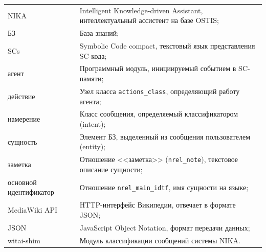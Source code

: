 \label{sec:reduction}

\noindent
\begin{tabular}{@{}p{3.6cm}@{\ \mdash\ }p{11.0cm}@{}}
NIKA & Intelligent Knowledge-driven Assistant, интеллектуальный ассистент на базе OSTIS;\\
БЗ & База знаний;\\
SCs & Symbolic Code compact, текстовый язык представления SC-кода;\\
агент & Программный модуль, инициируемый событием в SC-памяти;\\
действие & Узел класса \texttt{actions\_class}, определяющий работу агента;\\
намерение & Класс сообщения, определяемый классификатором (intent);\\
сущность & Элемент БЗ, выделенный из сообщения пользователем (entity);\\
заметка & Отношение <<заметка>> (\texttt{nrel\_note}), текстовое описание сущности;\\
основной идентификатор & Отношение \texttt{nrel\_main\_idtf}, имя сущности на языке;\\
MediaWiki API & HTTP-интерфейс Википедии, отвечает в формате JSON;\\
JSON & JavaScript Object Notation, формат передачи данных;\\
witai-shim & Модуль классификации сообщений системы NIKA.
\end{tabular}
